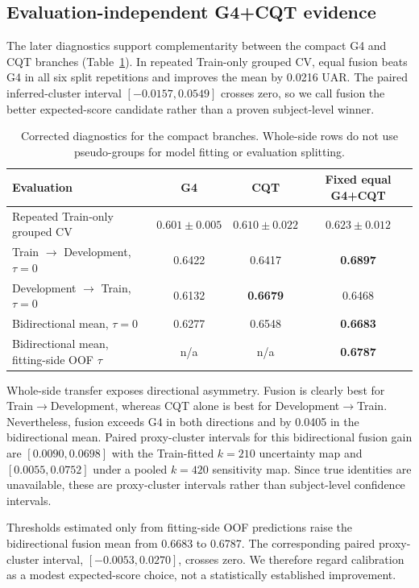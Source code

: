 \subsection{Evaluation-independent G4+CQT evidence}

The later diagnostics support complementarity between the compact G4 and CQT
branches (Table~\ref{tab:corrected}). In repeated Train-only grouped CV, equal
fusion beats G4 in all six split repetitions and improves the mean by 0.0216
UAR. The paired inferred-cluster interval $[-0.0157,0.0549]$ crosses zero, so
we call fusion the better expected-score candidate rather than a proven
subject-level winner.

\begin{table}[t]
\centering
\caption{Corrected diagnostics for the compact branches. Whole-side rows do
not use pseudo-groups for model fitting or evaluation splitting.}
\label{tab:corrected}
\small
\begin{tabular}{lccc}
\toprule
Evaluation & G4 & CQT & Fixed equal G4+CQT \\
\midrule
Repeated Train-only grouped CV & $0.601\pm0.005$ & $0.610\pm0.022$ & $\mathbf{0.623\pm0.012}$ \\
Train $\rightarrow$ Development, $\tau=0$ & 0.6422 & 0.6417 & \textbf{0.6897} \\
Development $\rightarrow$ Train, $\tau=0$ & 0.6132 & \textbf{0.6679} & 0.6468 \\
Bidirectional mean, $\tau=0$ & 0.6277 & 0.6548 & \textbf{0.6683} \\
Bidirectional mean, fitting-side OOF $\tau$ & n/a & n/a & \textbf{0.6787} \\
\bottomrule
\end{tabular}
\end{table}

Whole-side transfer exposes directional asymmetry. Fusion is clearly best for
Train$\rightarrow$Development, whereas CQT alone is best for
Development$\rightarrow$Train. Nevertheless, fusion exceeds G4 in both
directions and by 0.0405 in the bidirectional mean. Paired proxy-cluster
intervals for this bidirectional fusion gain are $[0.0090,0.0698]$ with the
Train-fitted $k=210$ uncertainty map and $[0.0055,0.0752]$ under a pooled
$k=420$ sensitivity map. Since true identities are unavailable, these are
proxy-cluster intervals rather than subject-level confidence intervals.

Thresholds estimated only from fitting-side OOF predictions raise the
bidirectional fusion mean from 0.6683 to 0.6787. The corresponding paired
proxy-cluster interval, $[-0.0053,0.0270]$, crosses zero. We therefore regard
calibration as a modest expected-score choice, not a statistically established
improvement.

